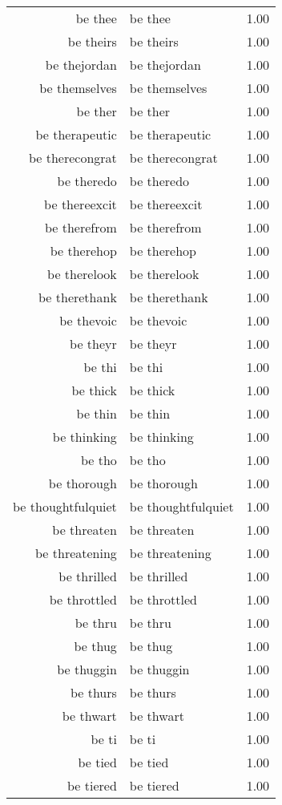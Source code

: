 \begin{table}[ht]
\begin{tabular}{rlr}
  be thee & be thee & 1.00 \\ 
  be theirs & be theirs & 1.00 \\ 
  be thejordan & be thejordan & 1.00 \\ 
  be themselves & be themselves & 1.00 \\ 
  be ther & be ther & 1.00 \\ 
  be therapeutic & be therapeutic & 1.00 \\ 
  be therecongrat & be therecongrat & 1.00 \\ 
  be theredo & be theredo & 1.00 \\ 
  be thereexcit & be thereexcit & 1.00 \\ 
  be therefrom & be therefrom & 1.00 \\ 
  be therehop & be therehop & 1.00 \\ 
  be therelook & be therelook & 1.00 \\ 
  be therethank & be therethank & 1.00 \\ 
  be thevoic & be thevoic & 1.00 \\ 
  be theyr & be theyr & 1.00 \\ 
  be thi & be thi & 1.00 \\ 
  be thick & be thick & 1.00 \\ 
  be thin & be thin & 1.00 \\ 
  be thinking & be thinking & 1.00 \\ 
  be tho & be tho & 1.00 \\ 
  be thorough & be thorough & 1.00 \\ 
  be thoughtfulquiet & be thoughtfulquiet & 1.00 \\ 
  be threaten & be threaten & 1.00 \\ 
  be threatening & be threatening & 1.00 \\ 
  be thrilled & be thrilled & 1.00 \\ 
  be throttled & be throttled & 1.00 \\ 
  be thru & be thru & 1.00 \\ 
  be thug & be thug & 1.00 \\ 
  be thuggin & be thuggin & 1.00 \\ 
  be thurs & be thurs & 1.00 \\ 
  be thwart & be thwart & 1.00 \\ 
  be ti & be ti & 1.00 \\ 
  be tied & be tied & 1.00 \\ 
  be tiered & be tiered & 1.00 \\ 

\end{tabular}
\end{table}
